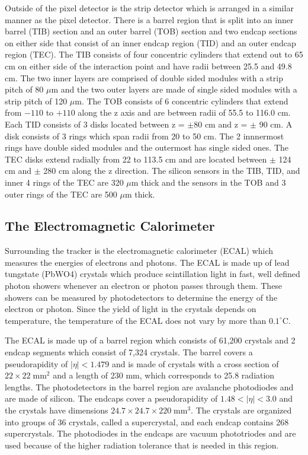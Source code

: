 Outside of the pixel detector is the strip detector which is arranged in a similar manner as the pixel detector. There is a barrel region that is split into an inner barrel (TIB) section and an outer barrel (TOB) section and two endcap sections on either side that consist of an inner endcap region (TID) and an outer endcap region (TEC). The TIB consists of four concentric cylinders that extend out to 65 cm on either side of the interaction point and have radii between 25.5 and 49.8 cm. The two inner layers are comprised of double sided modules with a strip pitch of 80 $\mu$m and the two outer layers are made of single sided modules with a strip pitch of 120 $\mu$m. The TOB consists of 6 concentric cylinders that extend from $-110$ to $+110$ along the z axis and are between radii of 55.5 to 116.0 cm. Each TID consists of 3 disks located between z = $\pm 80$ cm and z = $\pm$ 90 cm. A disk consists of 3 rings which span radii from 20 to 50 cm. The 2 innnermost rings have double sided modules and the outermost has single sided ones. The TEC disks extend radially from 22 to 113.5 cm and are located between $\pm$ 124 cm and $\pm$ 280 cm along the z direction. The silicon sensors in the TIB, TID, and inner 4 rings of the TEC are 320 $\mu$m thick and the sensors in the TOB and 3 outer rings of the TEC are 500 $\mu$m thick\cite{CMSExperiment}.

\subsection{The Electromagnetic Calorimeter}

Surrounding the tracker is the electromagnetic calorimeter (ECAL) which measures the energies of electrons and photons. The ECAL is made up of lead tungstate (PbWO4) crystals which produce scintillation light in fast, well defined photon showers whenever an electron or photon passes through them. These showers can be measured by photodetectors to determine the energy of the electron or photon. Since the yield of light in the crystals depends on temperature, the temperature of the ECAL does not vary by more than $0.1^{\circ}$C. 

The ECAL is made up of a barrel region which consists of 61,200 crystals and 2 endcap segments which consist of 7,324 crystals. The barrel covers a pseudorapidity of $|\eta| < 1.479$ and is made of crystals with a cross section of $22\times22\;\mathrm{mm}^{2}$ and a length of 230 mm, which corresponds to 25.8 radiation lengths. The photodetectors in the barrel region are avalanche photodiodes and are made of silicon. The endcaps cover a pseudorapidity of $1.48 < |\eta| < 3.0$ and the crystals have dimensions $24.7\times24.7\times220\;\mathrm{mm}^{3}$. The crystals are organized into groups of 36 crystals, called a supercrystal, and each endcap contains 268 supercrystals. The photodiodes in the endcaps are vacuum phototriodes and are used because of the higher radiation tolerance that is needed in this region.

